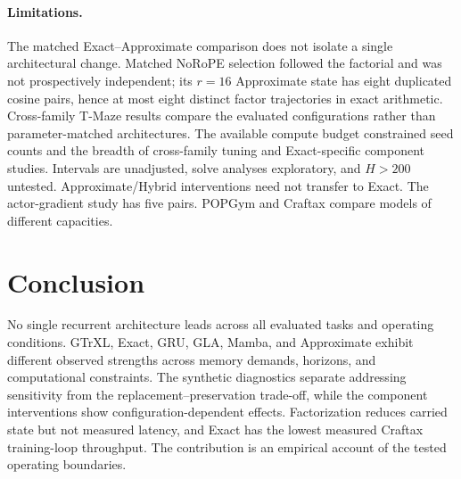 \paragraph{Limitations.}
The matched Exact--Approximate comparison does not isolate a single architectural change. Matched NoRoPE selection followed the factorial and was not prospectively independent; its $r=16$ Approximate state has eight duplicated cosine pairs, hence at most eight distinct factor trajectories in exact arithmetic. Cross-family T-Maze results compare the evaluated configurations rather than parameter-matched architectures. The available compute budget constrained seed counts and the breadth of cross-family tuning and Exact-specific component studies. Intervals are unadjusted, solve analyses exploratory, and $H>200$ untested. Approximate/Hybrid interventions need not transfer to Exact. The actor-gradient study has five pairs. POPGym and Craftax compare models of different capacities.

\section{Conclusion}
No single recurrent architecture leads across all evaluated tasks and operating conditions. GTrXL, Exact, GRU, GLA, Mamba, and Approximate exhibit different observed strengths across memory demands, horizons, and computational constraints. The synthetic diagnostics separate addressing sensitivity from the replacement--preservation trade-off, while the component interventions show configuration-dependent effects. Factorization reduces carried state but not measured latency, and Exact has the lowest measured Craftax training-loop throughput. The contribution is an empirical account of the tested operating boundaries.
